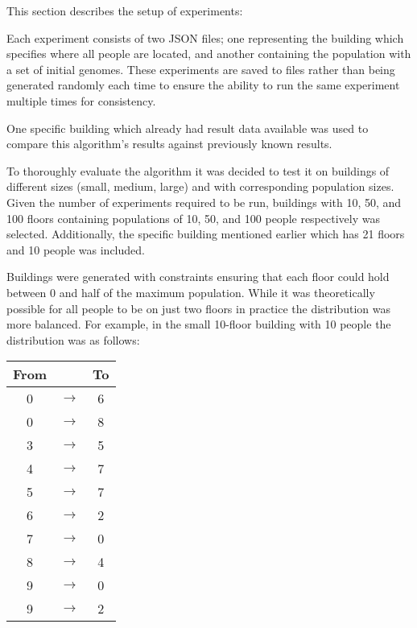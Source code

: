 
This section describes the setup of experiments:

Each experiment consists of two JSON files; one representing the building which specifies where all people are located, and another containing the population with a set of initial genomes.
These experiments are saved to files rather than being generated randomly each time to ensure the ability to run the same experiment multiple times for consistency.

One specific building which already had result data available was used to compare this algorithm's results against previously known results.

To thoroughly evaluate the algorithm it was decided to test it on buildings of different sizes (small, medium, large) and with corresponding population sizes.
Given the number of experiments required to be run, buildings with 10, 50, and 100 floors containing populations of 10, 50, and 100 people respectively was selected. Additionally, the specific building mentioned earlier which has 21 floors and 10 people was included.

Buildings were generated with constraints ensuring that each floor could hold between 0 and half of the maximum population.
While it was theoretically possible for all people to be on just two floors in practice the distribution was more balanced. For example, in the small 10-floor building with 10 people the distribution was as follows:

\begin{center}
	\begin{tabular}{c c c}
		\textbf{From} &       & \textbf{To} \\
		\hline
		0             & $\to$ & 6           \\
		0             & $\to$ & 8           \\
		3             & $\to$ & 5           \\
		4             & $\to$ & 7           \\
		5             & $\to$ & 7           \\
		6             & $\to$ & 2           \\
		7             & $\to$ & 0           \\
		8             & $\to$ & 4           \\
		9             & $\to$ & 0           \\
		9             & $\to$ & 2           \\
	\end{tabular}
\end{center}

